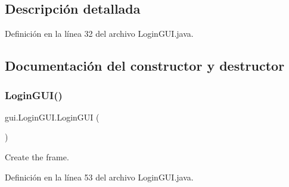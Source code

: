 \subsection{Descripción detallada}


Definición en la línea 32 del archivo Login\+G\+U\+I.\+java.



\subsection{Documentación del constructor y destructor}
\mbox{\label{classgui_1_1_login_g_u_i_a7a72f964aac46a80b5bb46f116d342fb}} 
\subsubsection{\texorpdfstring{LoginGUI()}{LoginGUI()}}
{\footnotesize\ttfamily gui.\+Login\+G\+U\+I.\+Login\+G\+UI (\begin{DoxyParamCaption}{ }\end{DoxyParamCaption})}



Create the frame. 



Definición en la línea 53 del archivo Login\+G\+U\+I.\+java.



